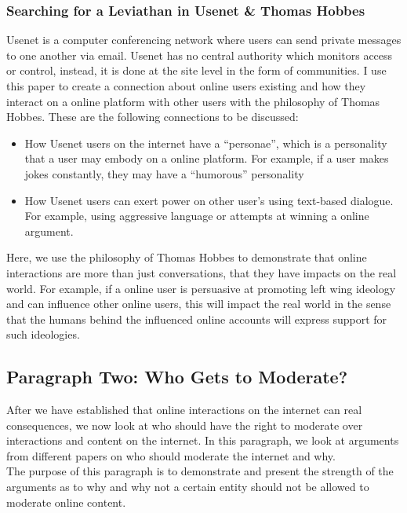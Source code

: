 \documentclass[a4paper]{article}
\begin{document}
\subsubsection{Searching for a Leviathan in Usenet \& Thomas Hobbes}
Usenet is a computer conferencing network where users can send private messages to one another via email. Usenet has no
central authority which monitors access or control, instead, it is done at the site level in the form of communities.
I use this paper to create a connection about online users existing and how they interact on a online platform with
other users with the philosophy of Thomas Hobbes. These are the following connections to be discussed:

\begin{itemize}
    \item How Usenet users on the internet have a ``personae'', which is a personality that a user may embody on a 
    online platform. For example, if a user makes jokes constantly, they may have a ``humorous'' personality
    \item How Usenet users can exert power on other user's using text-based dialogue. For example, using aggressive
    language or attempts at winning a online argument.
\end{itemize}

\noindent Here, we use the philosophy of Thomas Hobbes to demonstrate that online interactions are more than just 
conversations, that they have impacts on the real world. For example, if a online user is persuasive at promoting
left wing ideology and can influence other online users, this will impact the real world in the sense that the 
humans behind the influenced online accounts will express support for such ideologies.

\subsection{Paragraph Two: Who Gets to Moderate?}
After we have established that online interactions on the internet can real consequences, we now look at who should
have the right to moderate over interactions and content on the internet. In this paragraph, we look at arguments
from different papers on who should moderate the internet and why. \\

\noindent The purpose of this paragraph is to demonstrate and present the strength of the arguments as to why and
why not a certain entity should not be allowed to moderate online content.
\end{document}
